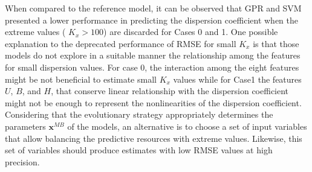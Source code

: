 \documentclass[a4paper,12pt, english]{article}
\newcommand{\x}{\mathbf{x}}
\begin{document}
When compared to the reference model, it can be observed that  GPR and SVM  presented a lower performance in predicting the dispersion coefficient when the extreme values ( $K_x > 100$) are discarded for Cases 0 and 1.  One possible explanation to the deprecated performance of RMSE  for small $K_x$ is that those models do not explore in a suitable manner the relationship among the features for small dispersion values. For case 0, the interaction among the eight features might be not beneficial to estimate small $K_x$ values while for Case1 the features $U$, $B$, and $H$, that conserve linear relationship with the dispersion coefficient might not be enough to represent the nonlinearities of the dispersion coefficient. 
% 
Considering that the evolutionary strategy appropriately determines the parameters $ \x^{MB} $ of the models, an alternative is to choose a set of input variables that allow balancing the predictive resources with extreme values. Likewise, this set of variables should produce estimates with low RMSE values at high precision.

\end{document}
